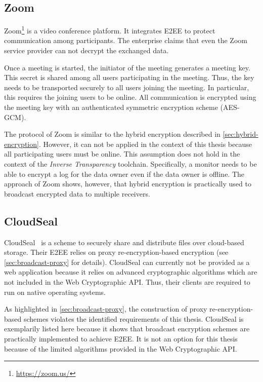 \documentclass[../main.tex]{subfiles}
\begin{document}
\subsection{Zoom}
Zoom\footnote{\url{https://zoom.us/}} is a video conference platform. 
It integrates E2EE to protect communication among participants.
The enterprise claims that even the Zoom service provider can not decrypt the exchanged data.~\cite{Blum2020}

Once a meeting is started, the initiator of the meeting generates a meeting key.
This secret is shared among all users participating in the meeting.
Thus, the key needs to be transported securely to all users joining the meeting.
In particular, this requires the joining users to be online.
All communication is encrypted using the meeting key with an authenticated symmetric encryption scheme (AES-GCM).
~\cite{Isobe2021}

The protocol of Zoom is similar to the hybrid encryption described in \cref{sec:hybrid-encryption}.
However, it can not be applied in the context of this thesis because all participating users must be online.
This assumption does not hold in the context of the \emph{Inverse Transparency} toolchain.
Specifically, a monitor needs to be able to encrypt a log for the data owner even if the data owner is offline.
The approach of Zoom shows, however, that hybrid encryption is practically used to broadcast encrypted data to multiple receivers.

\subsection{CloudSeal}
CloudSeal~\cite{Xiong2012} is a scheme to securely share and distribute files over cloud-based storage.
Their E2EE relies on proxy re-encryption-based encryption (see \cref{sec:broadcast-proxy} for details).
CloudSeal can currently not be provided as a web application because it relies on advanced cryptographic algorithms which are not included in the Web Cryptographic API.
Thus, their clients are required to run on native operating systems.~\cite{Xiong2012}

As highlighted in \cref{sec:broadcast-proxy}, the construction of proxy re-encryption-based schemes violates the identified requirements of this thesis.
CloudSeal is exemplarily listed here because it shows that broadcast encryption schemes are practically implemented to achieve E2EE.
It is not an option for this thesis because of the limited algorithms provided in the Web Cryptographic API.
\end{document}
